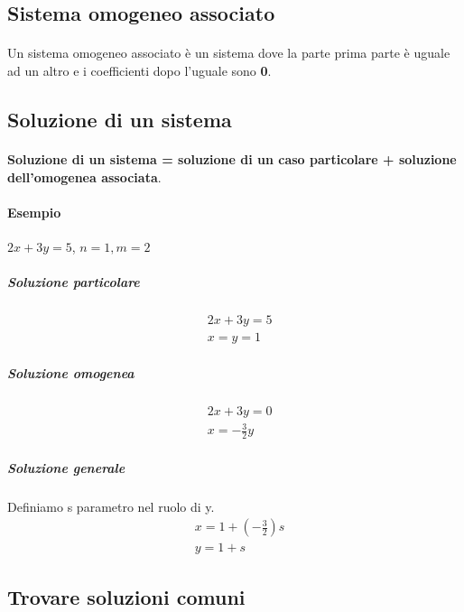 \documentclass[a4paper, 12pt]{report}
\begin{document}
                \subsection{Sistema omogeneo associato}
                    \paragraph{}Un sistema omogeneo associato è un sistema dove la parte prima parte è uguale
                    ad un altro e i coefficienti dopo l'uguale sono \textbf{0}.
                \subsection{Soluzione di un sistema}
                    \paragraph{}\textbf{Soluzione di un sistema = soluzione di un caso particolare + soluzione dell'omogenea associata}.
                    \paragraph{Esempio} $2x+3y=5$, $n=1, m=2$
                        \subparagraph{Soluzione particolare}
                            \begin{align*}
                                &2x+3y=5\\
                                &x=y=1
                            \end{align*}
                        \subparagraph{Soluzione omogenea}
                            \begin{align*}
                                &2x+3y=0\\
                                &x=-\frac{3}{2}y
                            \end{align*}
                        \subparagraph{Soluzione generale}Definiamo s parametro nel ruolo di y.
                            \begin{align*}
                                &x=1+(-\frac{3}{2})s\\
                                &y=1+s
                            \end{align*}
                \subsection{Trovare soluzioni comuni}
\end{document}
